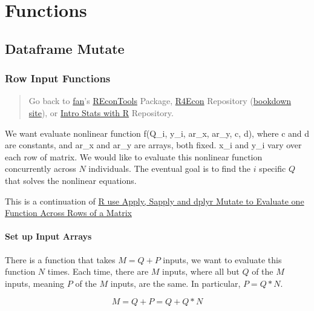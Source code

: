 \documentclass[
]{book}
\begin{document}
\hypertarget{functions}{%
\chapter{Functions}\label{functions}}

\hypertarget{dataframe-mutate}{%
\section{Dataframe Mutate}\label{dataframe-mutate}}

\hypertarget{row-input-functions}{%
\subsection{Row Input Functions}\label{row-input-functions}}

\begin{quote}
Go back to \href{http://fanwangecon.github.io/}{fan}'s \href{https://fanwangecon.github.io/REconTools/}{REconTools} Package, \href{https://fanwangecon.github.io/R4Econ/}{R4Econ} Repository (\href{https://fanwangecon.github.io/R4Econ/bookdown}{bookdown site}), or \href{https://fanwangecon.github.io/Stat4Econ/}{Intro Stats with R} Repository.
\end{quote}

We want evaluate nonlinear function f(Q\_i, y\_i, ar\_x, ar\_y, c, d), where c and d are constants, and ar\_x and ar\_y are arrays, both fixed. x\_i and y\_i vary over each row of matrix. We would like to evaluate this nonlinear function concurrently across \(N\) individuals. The eventual goal is to find the \(i\) specific \(Q\) that solves the nonlinear equations.

This is a continuation of \href{https://fanwangecon.github.io/R4Econ/function/noloop/fs_applysapplymutate.html}{R use Apply, Sapply and dplyr Mutate to Evaluate one Function Across Rows of a Matrix}

\hypertarget{set-up-input-arrays}{%
\subsubsection{Set up Input Arrays}\label{set-up-input-arrays}}

There is a function that takes \(M=Q+P\) inputs, we want to evaluate this function \(N\) times. Each time, there are \(M\) inputs, where all but \(Q\) of the \(M\) inputs, meaning \(P\) of the \(M\) inputs, are the same. In particular, \(P=Q*N\).

\[M = Q+P = Q + Q*N\]
\end{document}
